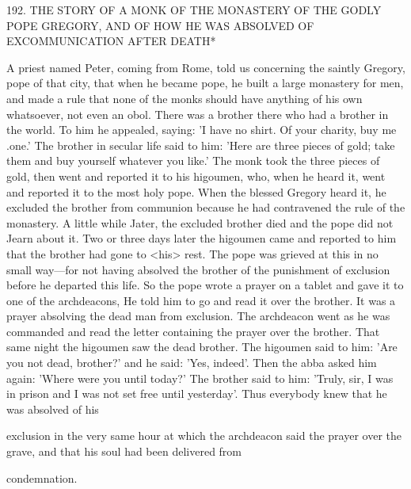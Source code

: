 192.
THE STORY OF A MONK
OF THE MONASTERY OF THE
GODLY POPE GREGORY,
AND OF HOW HE WAS ABSOLVED
OF EXCOMMUNICATION AFTER DEATH*

A priest named Peter, coming from Rome, told us concerning the
saintly Gregory, pope of that city, that when he became pope, he
built a large monastery for men, and made a rule that none of the
monks should have anything of his own whatsoever, not even an
obol.
There was a brother there who had a brother in the world.
To
him he appealed, saying: 'I have no shirt.
Of your charity, buy me
.one.' The brother in secular life said to him: 'Here are three pieces
of gold; take them and buy yourself whatever you like.' The monk
took the three pieces of gold, then went and reported it to his
higoumen, who, when he heard it, went and reported it to the most
holy pope.
When the blessed Gregory heard it, he excluded the
brother from communion because he had contravened the rule of
the monastery.
A little while Jater, the excluded brother died and the
pope did not Jearn about it.
Two or three days later the higoumen
came and reported to him that the brother had gone to <his> rest.
The pope was grieved at this in no small way—for not having
absolved the brother of the punishment of exclusion before he
departed this life.
So the pope wrote a prayer on a tablet and gave
it to one of the archdeacons, He told him to go and read it over the
brother.
It was a prayer absolving the dead man from exclusion.
The archdeacon went as he was commanded and read the letter
containing the prayer over the brother.
That same night the
higoumen saw the dead brother.
The higoumen said to him: 'Are
you not dead, brother?' and he said: 'Yes, indeed'.
Then the abba
asked him again: 'Where were you until today?' The brother said to
him: 'Truly, sir, I was in prison and I was not set free until
yesterday'.
Thus everybody knew that he was absolved of his

exclusion in the very same hour at which the archdeacon said the
prayer over the grave, and that his soul had been delivered from

condemnation.

